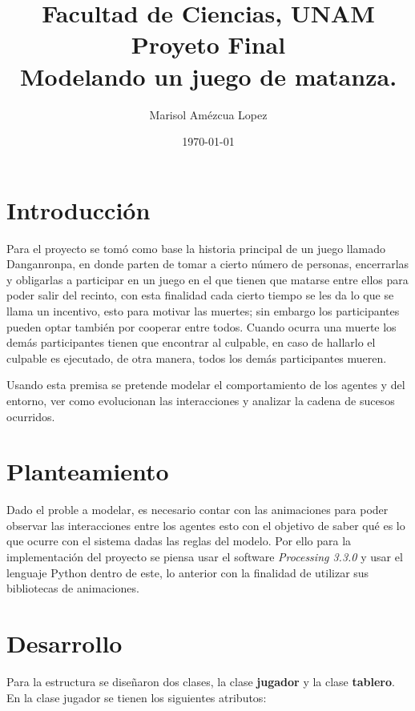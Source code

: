 \documentclass[11pt,letterpaper]{article}
\title {Facultad de Ciencias, UNAM\\
		Proyeto Final\\  
		Modelando un juego de matanza.\\  
		}
\author{Marisol Amézcua Lopez }
\date{\today}
\begin{document}
\maketitle

\section{Introducción}

Para el proyecto se tomó como base la historia principal de un juego llamado Danganronpa, en donde parten de tomar a cierto número de personas, encerrarlas y obligarlas a participar en un juego en el que tienen que matarse entre ellos para 
poder salir del recinto, con esta finalidad cada cierto tiempo se les da lo que se llama un incentivo, esto para motivar 
las muertes; sin embargo los participantes pueden optar también por cooperar entre todos. 
Cuando ocurra una muerte los demás participantes tienen que encontrar al culpable, en caso de hallarlo el culpable es ejecutado, de otra manera, todos los demás participantes mueren.

Usando esta premisa se pretende modelar el comportamiento de los agentes y del 
entorno, ver como evolucionan las interacciones y analizar la cadena de sucesos
ocurridos.

\section{Planteamiento}
Dado el proble a modelar, es necesario contar con las animaciones para poder observar las interacciones entre los agentes esto con el objetivo de saber qué es lo que 
ocurre con el sistema dadas las reglas del modelo.
Por ello para la implementación del proyecto se piensa usar el software \emph{Processing 3.3.0} y usar el lenguaje Python dentro de este, lo anterior con la finalidad de utilizar sus bibliotecas de animaciones.

\section{Desarrollo}
Para la estructura se diseñaron dos clases, la clase \textbf{jugador} y la clase
\textbf{tablero}.
En la clase jugador se tienen los siguientes atributos:
\end{document}
